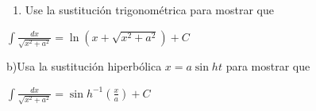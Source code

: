 \documentclass[12pt,]{article}
\providecommand{\tightlist}{%
  \setlength{\itemsep}{0pt}\setlength{\parskip}{0pt}}
\begin{document}
\begin{enumerate}
\def\labelenumi{\alph{enumi})}
\tightlist
\item
  Use la sustitución trigonométrica para mostrar que
\end{enumerate}

\(\displaystyle\int\frac{dx}{\sqrt{x^2+a^2}}=\ln (x+\sqrt{x^2+a^2})+C\)

b)Usa la sustitución hiperbólica \(x=a \sin h t\) para mostrar que

\(\displaystyle\int\frac{dx}{\sqrt{x^2+a^2}}=\sin h^{-1}\left(\frac{x}{a}\right)+ C\)
\end{document}
